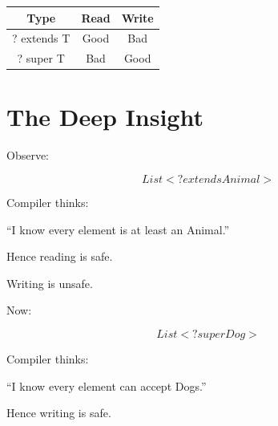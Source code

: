 \documentclass[11pt,a4paper]{book}
\begin{document}
\begin{center}

\begin{tabular}{|c|c|c|}
\hline
Type &
Read &
Write \\
\hline

? extends T &
Good &
Bad \\
\hline

? super T &
Bad &
Good \\
\hline

\end{tabular}

\end{center}


\section{The Deep Insight}

Observe:

\[
List<? extends Animal>
\]


Compiler thinks:


``I know every element
is at least an Animal.''


Hence reading is safe.


Writing is unsafe.


Now:

\[
List<? super Dog>
\]


Compiler thinks:


``I know every element
can accept Dogs.''


Hence writing is safe.

\end{document}
